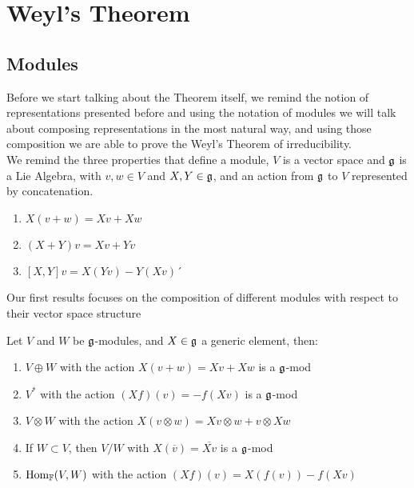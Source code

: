 \section{Weyl's Theorem}
\subsection*{Modules}
Before we start talking about the Theorem itself, we remind the notion of representations presented before and using the notation of modules we will talk about composing representations in the most natural way, and using those composition we are able to prove the Weyl's Theorem of irreducibility.\\
We remind the three properties that define a module, $V$ is a vector space and $\mathfrak{g}$ is a Lie Algebra, with $v,w \in V$ and $X,Y \in \mathfrak{g}$, and an action from $\mathfrak{g}$ to $V$ represented by concatenation.
\begin{enumerate}[label=\Alph*.]
	\item $X(v+w) = Xv+Xw$ 
	\item $(X+Y)v = Xv + Yv$
	\item $[X,Y]v = X(Yv) - Y(Xv)$´
\end{enumerate}
Our first results focuses on the composition of different modules with respect to their vector space structure
\begin{prop}
	Let $V$ and $W$ be $\mathfrak{g}$-modules, and $X \in \mathfrak{g}$ a generic element, then:
	\begin{enumerate}
		\item $V \oplus W$ with the action $X(v+w) = Xv+Xw$ is a $\mathfrak{g}$-mod
		\item $V^*$ with the action $(Xf)(v) = -f(Xv)$ is a $\mathfrak{g}$-mod
		\item $V \otimes W$ with the action $X(v\otimes w) = Xv \otimes w + v \otimes Xw$
		\item If $W \subset V$, then $V/W$ with $X(\overline{v}) = \overline{Xv}$ is a $\mathfrak{g}$-mod
		\item $\text{Hom}_{\mathbb{F}}(V,W)$ with the action $(Xf)(v) = X(f(v)) - f(Xv) $
	\end{enumerate}
	\label{module composition}
\end{prop}
